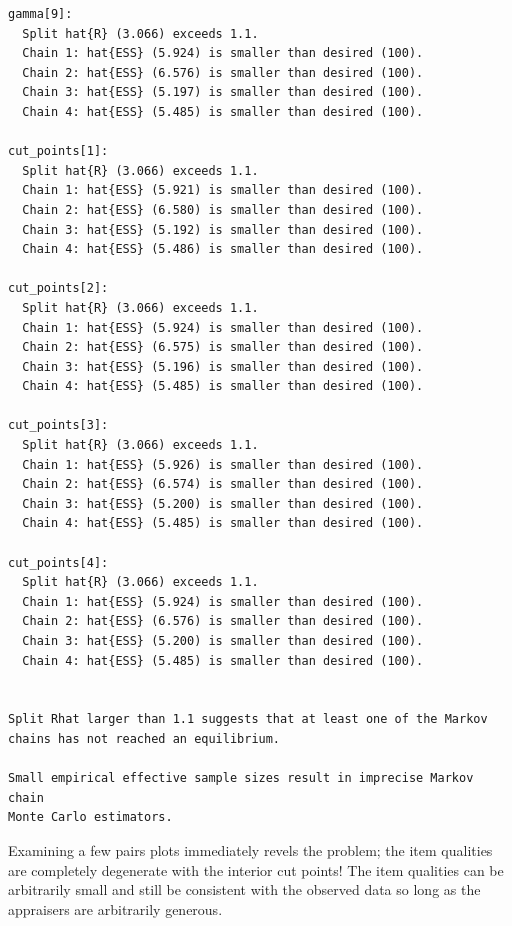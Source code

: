 \documentclass[
  letterpaper,
  DIV=11,
  numbers=noendperiod]{scrartcl}
\newenvironment{Shaded}{\begin{snugshade}}{\end{snugshade}}
\newcommand{\FunctionTok}[1]{\textcolor[rgb]{0.28,0.35,0.67}{#1}}
\newcommand{\NormalTok}[1]{\textcolor[rgb]{0.00,0.23,0.31}{#1}}
\newcommand{\SpecialCharTok}[1]{\textcolor[rgb]{0.37,0.37,0.37}{#1}}
\newcommand{\StringTok}[1]{\textcolor[rgb]{0.13,0.47,0.30}{#1}}
\begin{document}
\begin{verbatim}
gamma[9]:
  Split hat{R} (3.066) exceeds 1.1.
  Chain 1: hat{ESS} (5.924) is smaller than desired (100).
  Chain 2: hat{ESS} (6.576) is smaller than desired (100).
  Chain 3: hat{ESS} (5.197) is smaller than desired (100).
  Chain 4: hat{ESS} (5.485) is smaller than desired (100).

cut_points[1]:
  Split hat{R} (3.066) exceeds 1.1.
  Chain 1: hat{ESS} (5.921) is smaller than desired (100).
  Chain 2: hat{ESS} (6.580) is smaller than desired (100).
  Chain 3: hat{ESS} (5.192) is smaller than desired (100).
  Chain 4: hat{ESS} (5.486) is smaller than desired (100).

cut_points[2]:
  Split hat{R} (3.066) exceeds 1.1.
  Chain 1: hat{ESS} (5.924) is smaller than desired (100).
  Chain 2: hat{ESS} (6.575) is smaller than desired (100).
  Chain 3: hat{ESS} (5.196) is smaller than desired (100).
  Chain 4: hat{ESS} (5.485) is smaller than desired (100).

cut_points[3]:
  Split hat{R} (3.066) exceeds 1.1.
  Chain 1: hat{ESS} (5.926) is smaller than desired (100).
  Chain 2: hat{ESS} (6.574) is smaller than desired (100).
  Chain 3: hat{ESS} (5.200) is smaller than desired (100).
  Chain 4: hat{ESS} (5.485) is smaller than desired (100).

cut_points[4]:
  Split hat{R} (3.066) exceeds 1.1.
  Chain 1: hat{ESS} (5.924) is smaller than desired (100).
  Chain 2: hat{ESS} (6.576) is smaller than desired (100).
  Chain 3: hat{ESS} (5.200) is smaller than desired (100).
  Chain 4: hat{ESS} (5.485) is smaller than desired (100).


Split Rhat larger than 1.1 suggests that at least one of the Markov
chains has not reached an equilibrium.

Small empirical effective sample sizes result in imprecise Markov chain
Monte Carlo estimators.
\end{verbatim}

Examining a few pairs plots immediately revels the problem; the item
qualities are completely degenerate with the interior cut points! The
item qualities can be arbitrarily small and still be consistent with the
observed data so long as the appraisers are arbitrarily generous.

\begin{Shaded}
\end{Shaded}
\end{document}
